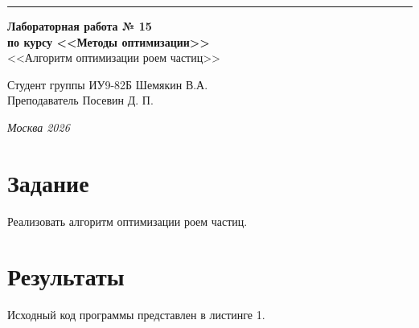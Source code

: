 \documentclass[a4paper, 14pt]{extarticle}
\begin{document}
\begin{titlepage}
\vspace*{-16pt}
\hspace{30pt}\rule{0.866\textwidth}{0.4pt}
  
\vspace{11em}

\begin{center}
\Large {\bf Лабораторная работа № 15} \\ 
\large {\bf по курсу <<Методы оптимизации>>} \\
\large <<Алгоритм оптимизации роем частиц>> 
\end{center}\normalsize

\vspace{8em}


\begin{flushright}
  {Студент группы ИУ9-82Б Шемякин В.А. \hspace*{15pt}\\ 
  \vspace{2ex}
  Преподаватель Посевин Д. П.\hspace*{15pt}}
\end{flushright}

\bigskip

\vfill
 

\begin{center}
\textsl{Москва 2026}
\end{center}
\end{titlepage}

\renewcommand{\ttdefault}{pcr}

\setlength{\tabcolsep}{3pt}
\newpage
\setcounter{page}{2}

\section{Задание}\label{Sect::task}
Реализовать алгоритм оптимизации роем частиц.
\section{Результаты}\label{Sect::res}

Исходный код программы представлен в листинге 1.
\end{document}
